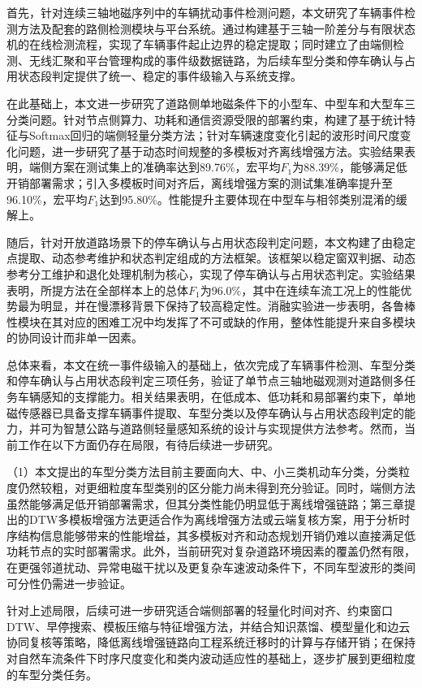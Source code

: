 \documentclass{xdupgthesis}
\begin{document}
首先，针对连续三轴地磁序列中的车辆扰动事件检测问题，本文研究了车辆事件检测方法及配套的路侧检测模块与平台系统。通过构建基于三轴一阶差分与有限状态机的在线检测流程，实现了车辆事件起止边界的稳定提取；同时建立了由端侧检测、无线汇聚和平台管理构成的事件级数据链路，为后续车型分类和停车确认与占用状态段判定提供了统一、稳定的事件级输入与系统支撑。

在此基础上，本文进一步研究了道路侧单地磁条件下的小型车、中型车和大型车三分类问题。针对节点侧算力、功耗和通信资源受限的部署约束，构建了基于统计特征与Softmax回归的端侧轻量分类方法；针对车辆速度变化引起的波形时间尺度变化问题，进一步研究了基于动态时间规整的多模板对齐离线增强方法。实验结果表明，端侧方案在测试集上的准确率达到89.76\%，宏平均$F_1$为88.39\%，能够满足低开销部署需求；引入多模板时间对齐后，离线增强方案的测试集准确率提升至96.10\%，宏平均$F_1$达到95.80\%。性能提升主要体现在中型车与相邻类别混淆的缓解上。

随后，针对开放道路场景下的停车确认与占用状态段判定问题，本文构建了由稳定点提取、动态参考维护和状态判定组成的方法框架。该框架以稳定窗双判据、动态参考分工维护和退化处理机制为核心，实现了停车确认与占用状态判定。实验结果表明，所提方法在全部样本上的总体$F_1$为96.0\%，其中在连续车流工况上的性能优势最为明显，并在慢漂移背景下保持了较高稳定性。消融实验进一步表明，各鲁棒性模块在其对应的困难工况中均发挥了不可或缺的作用，整体性能提升来自多模块的协同设计而非单一因素。

总体来看，本文在统一事件级输入的基础上，依次完成了车辆事件检测、车型分类和停车确认与占用状态段判定三项任务，验证了单节点三轴地磁观测对道路侧多任务车辆感知的支撑能力。相关结果表明，在低成本、低功耗和易部署约束下，单地磁传感器已具备支撑车辆事件提取、车型分类以及停车确认与占用状态段判定的能力，并可为智慧公路与道路侧轻量感知系统的设计与实现提供方法参考。然而，当前工作在以下方面仍存在局限，有待后续进一步研究。

（1）本文提出的车型分类方法目前主要面向大、中、小三类机动车分类，分类粒度仍然较粗，对更细粒度车型类别的区分能力尚未得到充分验证。同时，端侧方法虽然能够满足低开销部署需求，但其分类性能仍明显低于离线增强链路；第三章提出的DTW多模板增强方法更适合作为离线增强方法或云端复核方案，用于分析时序结构信息能够带来的性能增益，其多模板对齐和动态规划开销仍难以直接满足低功耗节点的实时部署需求。此外，当前研究对复杂道路环境因素的覆盖仍然有限，在更强邻道扰动、异常电磁干扰以及更复杂车速波动条件下，不同车型波形的类间可分性仍需进一步验证。

针对上述局限，后续可进一步研究适合端侧部署的轻量化时间对齐、约束窗口DTW、早停搜索、模板压缩与特征增强方法，并结合知识蒸馏、模型量化和边云协同复核等策略，降低离线增强链路向工程系统迁移时的计算与存储开销；在保持对自然车流条件下时序尺度变化和类内波动适应性的基础上，逐步扩展到更细粒度的车型分类任务。
\end{document}

